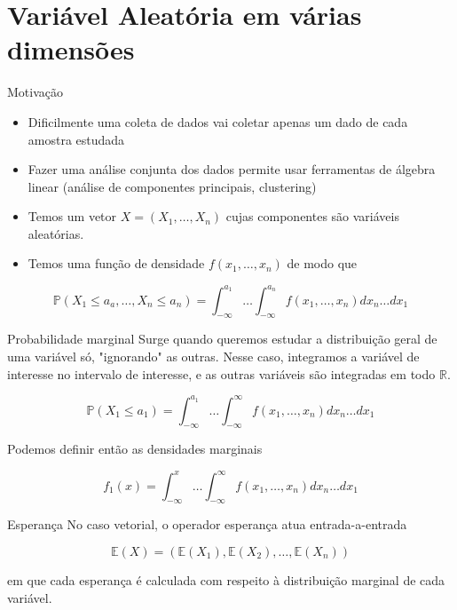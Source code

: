 \documentclass[
  ignorenonframetext,
  aspectratio=169,
]{beamer}
\providecommand{\tightlist}{%
  \setlength{\itemsep}{0pt}\setlength{\parskip}{0pt}}
\newcommand{\PP}{\mathbb{P}}
\newcommand{\EE}{\mathbb{E}}
\newcommand{\RR}{\mathbb{R}}
\begin{document}
\section{Variável Aleatória em várias dimensões}

\begin{frame}{Motivação}
\begin{itemize}
\tightlist
\item
  Dificilmente uma coleta de dados vai coletar apenas um dado de cada
  amostra estudada
\item
  Fazer uma análise conjunta dos dados permite usar ferramentas de
  álgebra linear (análise de componentes principais, clustering)
\end{itemize}
\end{frame}

\begin{frame}
\begin{itemize}
\tightlist
\item
  Temos um vetor \(X = (X_1, \ldots, X_n)\) cujas componentes são
  variáveis aleatórias.
\item
  Temos uma função de densidade \(f(x_1,\ldots, x_n)\) de modo que
\end{itemize}

\[\PP(X_1 \le a_a, \ldots, X_n \le a_n) = \int_{-\infty}^{a_1}\ldots\int_{-\infty}^{a_n} f(x_1,\ldots,x_n) dx_n\ldots dx_1 \]
\end{frame}

\begin{frame}{Probabilidade marginal}
Surge quando queremos estudar a distribuição geral de uma variável só,
"ignorando" as outras. Nesse caso, integramos a variável de interesse no
intervalo de interesse, e as outras variáveis são integradas em todo
\(\RR\).

\[\PP(X_1 \le a_1)  = \int_{-\infty}^{a_1}\ldots\int_{-\infty}^{\infty} f(x_1,\ldots,x_n) dx_n\ldots dx_1\]

Podemos definir então as densidades marginais

\[f_1(x) =  \int_{-\infty}^{x}\ldots\int_{-\infty}^{\infty} f(x_1,\ldots,x_n) dx_n\ldots dx_1\]
\end{frame}

\begin{frame}{Esperança}
No caso vetorial, o operador esperança atua entrada-a-entrada

\[\EE(X) = (\EE(X_1), \EE(X_2),\ldots, \EE(X_n))\]

em que cada esperança é calculada com respeito à distribuição marginal
de cada variável.
\end{frame}
\end{document}
